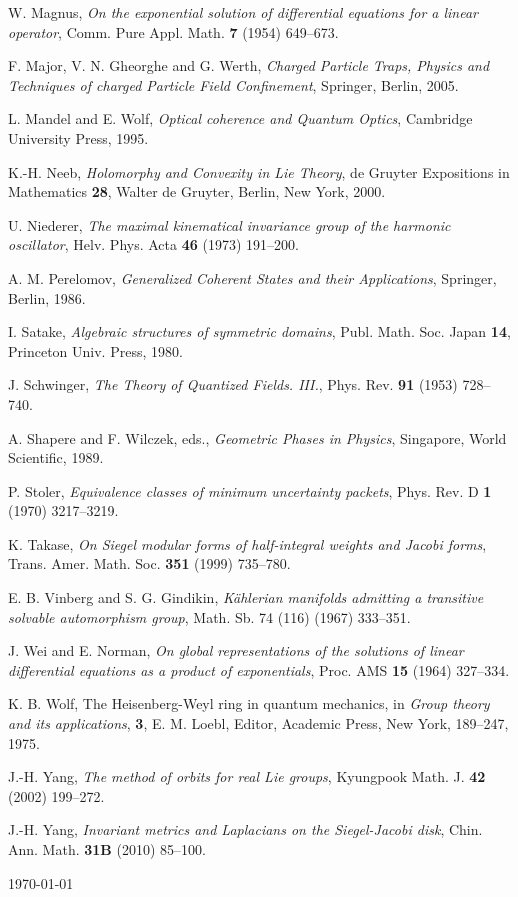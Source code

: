 \documentclass[12pt]{amsart}
\numberwithin{equation}{section}
\theoremstyle{definition}
\begin{document}
\begin{thebibliography}{99}
W. Magnus, {\it On the exponential solution of differential
equations for a linear operator}, Comm. Pure Appl. Math. {\bf 7}
(1954) 649--673.

F. Major, V. N. Gheorghe and  G. Werth, {\it Charged Particle Traps, Physics and Techniques of charged
Particle Field Confinement},  Springer, Berlin, 2005.

 L. Mandel and   E. Wolf, {\it Optical coherence and Quantum Optics}, Cambridge University Press, 1995.

K.-H. Neeb, {\it Holomorphy and Convexity in Lie Theory}, de
 Gruyter Expositions in Mathematics {\bf 28}, Walter de Gruyter,
 Berlin, New York, 2000.

U. Niederer, {\it  The maximal kinematical invariance
group of the harmonic oscillator}, {Helv. Phys. Acta} {\bf 46} (1973)
191--200.

A. M.  Perelomov, {\it Generalized Coherent States and their
Applications}, Springer, Berlin, 1986.

I. Satake, {\it Algebraic structures of symmetric domains},
Publ. Math. Soc. Japan {\bf 14},  Princeton Univ. Press,  1980.

J. Schwinger, {\it The Theory of Quantized Fields. III.},
  Phys. Rev. \textbf{91}  (1953) 728--740.  

A.   Shapere  and  F.  Wilczek, eds.,  {\it Geometric Phases in
    Physics}, Singapore,   World Scientific, 1989. 

P.  Stoler, {\it Equivalence classes of minimum uncertainty packets},
  Phys. Rev. D   {\bf  1}  (1970)  3217--3219.

 K. Takase, \textit{On Siegel modular forms of half-integral
weights and Jacobi forms}, Trans.  Amer. Math. Soc. {\bf 351}  (1999)
735--780. 

E. B. Vinberg and  S. G. Gindikin, {\it K\"ahlerian
    manifolds admitting a   transitive solvable automorphism group}, 
Math. Sb. 74 (116) (1967) 333--351.

J. Wei and E. Norman, {\it On global representations of
    the solutions of linear differential equations as a product of
    exponentials}, Proc. AMS  {\bf 15} (1964) 327--334.

 K. B.  Wolf, The Heisenberg-Weyl ring in quantum
mechanics, in
 {\it Group theory and its applications\/}, {\bf 3},  E. M. Loebl,
 Editor, 
Academic Press, New York, 189--247, 1975.

 J.-H. Yang, \textit{The method of orbits for real Lie groups},
Kyungpook Math. J. {\bf 42}  (2002) 199--272.

 J.-H. Yang, \textit{Invariant metrics and Laplacians on the
Siegel-Jacobi disk}, Chin. Ann. Math.  {\bf 31B}   (2010) 85--100.

\end{thebibliography}

\today
\end{document}
